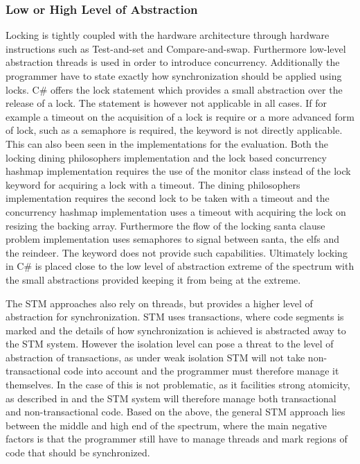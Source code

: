 \subsubsection{Low or High Level of Abstraction}\label{subsec:level_of_abstraction}
Locking is tightly coupled with the hardware architecture through hardware instructions such as Test-and-set and Compare-and-swap\cite[p. 1990]{scott2011sync}. Furthermore low-level abstraction threads is used in order to introduce concurrency. Additionally the programmer have to state exactly how synchronization should be applied using locks. C\# offers the lock  statement which provides a small abstraction over the release of a lock. The  statement is however not applicable in all cases. If for example a timeout on the acquisition of a lock is require or a more advanced form of lock, such as a semaphore is required, the  keyword is not directly applicable. This can also been seen in the implementations for the evaluation. Both the locking dining philosophers implementation and the lock based concurrency hashmap implementation requires the use of the monitor class instead of the lock keyword for acquiring a lock with a timeout. The dining philosophers implementation requires the second lock to be taken with a timeout and the concurrency hashmap implementation uses a timeout with acquiring the lock on resizing the backing array. Furthermore the flow of the locking santa clause problem implementation uses semaphores to signal between santa, the elfs and the reindeer. The  keyword does not provide such capabilities. Ultimately locking in C\# is placed close to the low level of abstraction extreme of the spectrum with the small abstractions provided keeping it from being at the extreme. 

The \ac{STM} approaches also rely on threads, but provides a higher level of abstraction for synchronization. \ac{STM} uses transactions, where code segments is marked and the details of how synchronization is achieved is abstracted away to the \ac{STM} system. However the isolation level can pose a threat to the level of abstraction of transactions, as under weak isolation \ac{STM} will not take non-transactional code into account and the programmer must therefore manage it themselves. In the case of \stmnamesp this is not problematic, as it facilities strong atomicity, as described in  and the \ac{STM} system will therefore manage both transactional and non-transactional code. Based on the above, the general \ac{STM} approach lies between the middle and high end of the spectrum, where the main negative factors is that the programmer still have to manage threads and mark regions of code that should be synchronized.

